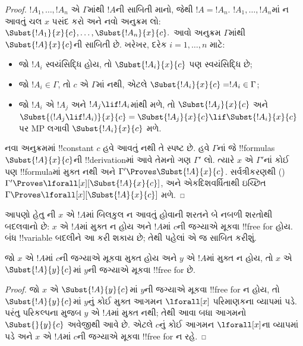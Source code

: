 \documentclass[../../../include/open-logic-section]{subfiles}
\begin{document}
\begin{proof} $!A_1,\ldots,!A_n$ એ $\Gamma$માંથી
$!A$ની સાબિતી માનો, જેથી $!A=!A_n$.
$!A_1,\ldots,!A_n$માં ન આવતું
ચલ $x$ પસંદ કરો અને
નવો અનુક્રમ લો:
$\Subst{!A_1}{x}{c},\ldots,\Subst{!A_n}{x}{c}.$
આવો અનુક્રમ $\Gamma$માંથી
$\Subst{!A}{x}{c}$ની સાબિતી છે.
ખરેખર, દરેક $i=1,\ldots,n$ માટે:
\begin{itemize}
\item જો $!A_i$ સ્વયંસિદ્ધિ હોય, તો
$\Subst{!A_i}{x}{c}$ પણ સ્વયંસિદ્ધિ છે;
\item જો $!A_i \in \Gamma$, તો
$c$ એ $\Gamma$માં નથી,
એટલે $\Subst{!A_i}{x}{c} = !A_i \in \Gamma$;
\item જો $!A_i$ એ $!A_j$
અને $!A_j \lif !A_i$માંથી મળે,
તો $\Subst{!A_j}{x}{c}$ અને
$\Subst{(!A_j \lif !A_i)}{x}{c}
= \Subst{!A_j}{x}{c} \lif \Subst{!A_i}{x}{c}$
પર MP લગાવી $\Subst{!A_i}{x}{c}$ મળે.
\end{itemize}
નવા અનુક્રમમાં !!{constant} $c$
હવે આવતું નથી તે સ્પષ્ટ છે.
હવે $\Gamma$નાં જે !!{formula}s
$\Subst{!A}{x}{c}$ની !!{derivation}માં
આવે તેમનો ગણ $\Gamma'$ લો.
ત્યારે $x$ એ $\Gamma'$નાં
કોઈ પણ !!{formula}માં મુક્ત નથી
અને $\Gamma' \Proves \Subst{!A}{x}{c}$.
સર્વત્રીકરણથી
()
$\Gamma' \Proves \lforall[x][\Subst{!A}{x}{c}]$,
અને એકદિશવર્ધિતાથી ઇચ્છિત
$\Gamma \Proves \lforall[x][\Subst{!A}{x}{c}]$ મળે.
\end{proof}

\begin{explain}
આપણો હેતુ ની
$x$ એ $!A$માં બિલકુલ ન આવતું
હોવાની શરતને બે નબળી શરતોથી
બદલવાનો છે: $x$ એ $!A$માં
મુક્ત ન હોય અને $!A$માં
$c$ની જગ્યાએ મૂકવા !!{free for}
હોય. બંધ !!{variable} બદલીને
આ કરી શકાય છે; તેથી પહેલાં
એ જ સાબિત કરીશું.
\end{explain}

\begin{lem}
જો $x$ એ $!A$માં $c$ની જગ્યાએ
મૂકવા મુક્ત હોય અને $y$ એ $!A$માં
મુક્ત ન હોય, તો $x$ એ
$\Subst{!A}{y}{c}$માં $y$ની
જગ્યાએ મૂકવા !!{free for} છે.
\end{lem}

\begin{proof} જો $x$ એ
$\Subst{!A}{y}{c}$માં
$y$ની જગ્યાએ મૂકવા
!!{free for} ન હોય,
તો $\Subst{!A}{y}{c}$માં
$y$નું કોઈ મુક્ત આગમન
$\lforall[x]$ પરિમાણકના
વ્યાપમાં પડે. પરંતુ
પરિકલ્પના મુજબ $y$
એ $!A$માં મુક્ત નથી;
તેથી આવા બધા આગમનો
$\Subst{}{y}{c}$ અવેજીથી
આવે છે. એટલે $c$નું
કોઈ આગમન $\lforall[x]$ના
વ્યાપમાં પડે અને $x$
એ $!A$માં $c$ની
જગ્યાએ મૂકવા
!!{free for} ન રહે.

\end{proof}
\end{document}
